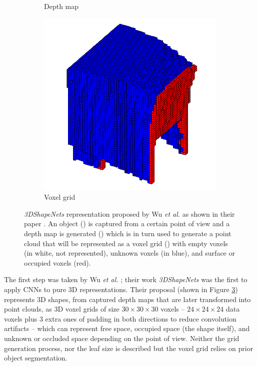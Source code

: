 \begin{figure}[!b]
\begin{subfigure}{0.32\textwidth}
		\caption{Depth map}
		\label{subfig:objrecog:3dshapenets:depth}
	\end{subfigure}
	\hfill
	\begin{subfigure}{0.32\textwidth}
		\centering
		\includegraphics[width=\linewidth]{Figures/ObjRecog/chair_grid_occluded}
		\caption{Voxel grid}
		\label{subfig:objrecog:3dshapenets:grid}
	\end{subfigure}
	\hfill
	\caption{\emph{3DShapeNets} representation proposed by Wu \emph{et al.} as shown in their paper \cite{Wu2015}. An object () is captured from a certain point of view and a depth map is generated () which is in turn used to generate a point cloud that will be represented as a voxel grid () with empty voxels (in white, not represented), unknown voxels (in blue), and surface or occupied voxels (red).}
	\label{fig:objrecog:3dshapenets}
\end{figure}

The first step was taken by Wu \emph{et al.} \cite{Wu2015}; their work \emph{3DShapeNets} was the first to apply \acp{CNN} to pure \acs{3D} representations. Their proposal (shown in Figure \ref{fig:objrecog:3dshapenets}) represents \acs{3D} shapes, from captured depth maps that are later transformed into point clouds, as \acs{3D} voxel grids of size $30\times30\times30$ voxels -- $24\times24\times24$ data voxels plus $3$ extra ones of padding in both directions to reduce convolution artifacts -- which can represent free space, occupied space (the shape itself), and unknown or occluded space depending on the point of view. Neither the grid generation process, nor the leaf size is described but the voxel grid relies on prior object segmentation.

